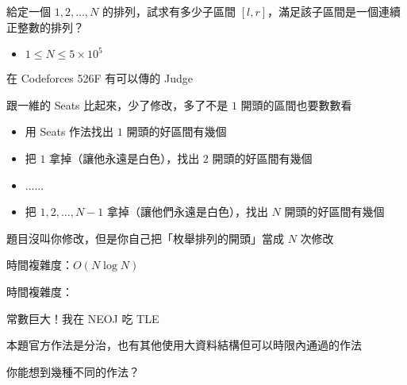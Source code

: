 \begin{frame}{}
    \begin{problem}
        給定一個 $1, 2, \dots, N$ 的排列，試求有多少子區間 $[l,r]$，滿足該子區間是一個連續正整數的排列？

        \begin{itemize}
            \item $1\le N \le 5\times10^5$
        \end{itemize}
    \end{problem}

    在 Codeforces 526F 有可以傳的 Judge
\end{frame}

\begin{frame}{}
    跟一維的 Seats 比起來，少了修改，多了不是 $1$ 開頭的區間也要數數看

     {
        \begin{itemize}
            \item 用 Seats 作法找出 $1$ 開頭的好區間有幾個
            \item 把 $1$ 拿掉（讓他永遠是白色），找出 $2$ 開頭的好區間有幾個
            \item ......
            \item 把 $1, 2, \dots, N - 1$ 拿掉（讓他們永遠是白色），找出 $N$ 開頭的好區間有幾個
        \end{itemize}
    }

     {
        題目沒叫你修改，但是你自己把「枚舉排列的開頭」當成 $N$ 次修改
    }
\end{frame}

\begin{frame}{}
     {
        時間複雜度：$O(N \log N)$
    }

     {
        時間複雜度：

        常數巨大！我在 NEOJ 吃 TLE
    }
\end{frame}

\begin{frame}{}
    本題官方作法是分治，也有其他使用大資料結構但可以時限內通過的作法

    你能想到幾種不同的作法？
\end{frame}

